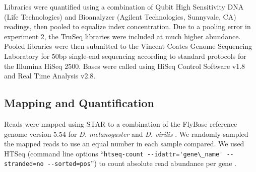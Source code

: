 Libraries were quantified using a combination of Qubit High Sensitivity DNA (Life Technologies) and Bioanalyzer (Agilent Technologies, Sunnyvale, CA) readings, then pooled to equalize index concentration. Due to a pooling error in experiment 2, the TruSeq libraries were included at much higher abundance. Pooled libraries were then submitted to the Vincent Coates Genome Sequencing Laboratory for 50bp single-end sequencing according to standard protocols for the Illumina HiSeq 2500. Bases were called using HiSeq Control Software v1.8 and Real Time Analysis v2.8.


\subsection{Mapping and Quantification}


Reads were mapped using STAR \cite{Dobin:2012fg} to a combination of the FlyBase reference genome version 5.54 for {\em D. melanogaster} and {\em D. virilis} \cite{McQuilton:2011iq}. We randomly sampled the mapped reads to use an equal number in each sample compared. We used HTSeq (command line options ``\verb|htseq-count --idattr='gene\_name' --stranded=no --sorted=pos|'') to count absolute read abundance per gene \cite{Anders_2014}.
